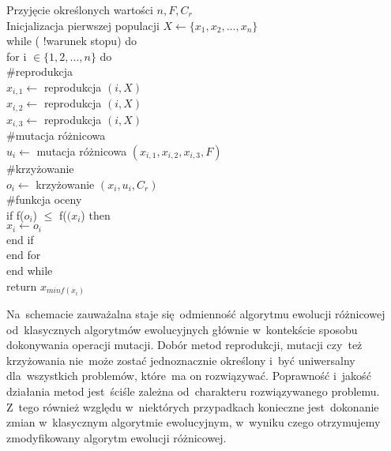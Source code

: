 \begin{flushleft}
\scriptsize
\hspace{5cm}Przyjęcie określonych wartości $n,F,C_{r}$\\
\hspace{5cm}Inicjalizacja pierwszej populacji $X \leftarrow \{x_{1}, x_{2},...,x_{n}\}$\\
\hspace{5cm}while ( !warunek stopu) do\\
\hspace{5.5cm}	for i $\in \{1,2,...,n\}$ do\\
\hspace{6cm} \#reprodukcja\\
\hspace{6,5cm} $x_{i,1} \leftarrow$ reprodukcja $(i,X)$\\
\hspace{6,5cm} $x_{i,2} \leftarrow$ reprodukcja $(i,X)$\\
\hspace{6,5cm} $x_{i,3} \leftarrow$ reprodukcja $(i,X)$\\
\hspace{6cm} \#mutacja różnicowa\\
\hspace{6.5cm} $u_{i} \leftarrow$ mutacja różnicowa $(x_{i,1},x_{i,2},x_{i,3},F)$\\
\hspace{6cm} \#krzyżowanie\\
\hspace{6.5cm} $o_{i} \leftarrow$ krzyżowanie $(x_{i},u_{i},C_{r})$\\
\hspace{6cm} \#funkcja oceny\\
\hspace{6.5cm} if f($o_{i}$) $\leq$ f($(x_{i}$) then\\
\hspace{7cm} $x_{i} \leftarrow o_{i}$\\
\hspace{6.5cm} end if \\
\hspace{5.5cm} end for\\
\hspace{5cm}end while \\
\hspace{5cm}return $x_{minf(x_{i})}$\\
\end{flushleft}

Na~schemacie zauważalna staje się~odmienność algorytmu ewolucji różnicowej od~klasycznych algorytmów ewolucyjnych głównie w~kontekście sposobu dokonywania operacji mutacji.
Dobór metod reprodukcji, mutacji czy~też krzyżowania nie~może zostać jednoznacznie określony i~być uniwersalny dla~wszystkich problemów, które~ma on rozwiązywać. Poprawność i~jakość działania metod jest~ściśle zależna od~charakteru rozwiązywanego problemu. Z~tego również względu w~niektórych przypadkach konieczne jest~dokonanie zmian w~klasycznym algorytmie ewolucyjnym, w~wyniku czego otrzymujemy zmodyfikowany algorytm ewolucji różnicowej.

